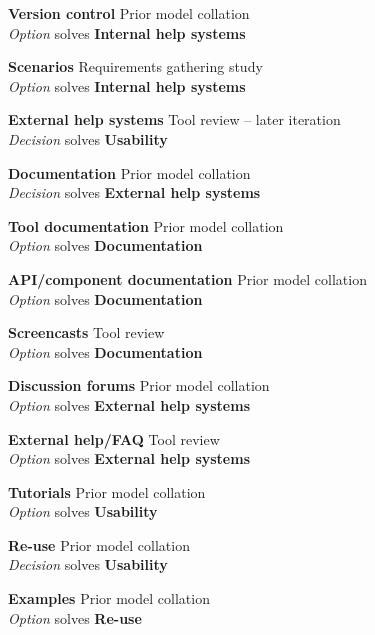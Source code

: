 \textbf{Version control} \hfill Prior model collation \cite{Grammel2010} \\ \emph{Option} \hfill solves \textbf{Internal help systems}

\textbf{Scenarios} \hfill Requirements gathering study \\ \emph{Option} \hfill solves \textbf{Internal help systems}

\textbf{External help systems} \hfill Tool review  -- later iteration \\ \emph{Decision} \hfill solves \textbf{Usability}

\textbf{Documentation} \hfill Prior model collation \cite{Grammel2010} \\ \emph{Decision} \hfill solves \textbf{External help systems}

\textbf{Tool documentation} \hfill Prior model collation \cite{Grammel2010} \\ \emph{Option} \hfill solves \textbf{Documentation}

\textbf{API/component documentation} \hfill Prior model collation \cite{Grammel2010} \\ \emph{Option} \hfill solves \textbf{Documentation}

\textbf{Screencasts} \hfill Tool review \\ \emph{Option} \hfill solves \textbf{Documentation}

\textbf{Discussion forums} \hfill Prior model collation \cite{Grammel2010} \\ \emph{Option} \hfill solves \textbf{External help systems}

\textbf{External help/FAQ} \hfill Tool review \\ \emph{Option} \hfill solves \textbf{External help systems}

\textbf{Tutorials} \hfill Prior model collation \cite{Grammel2010,Minhas2012} \\ \emph{Option} \hfill solves \textbf{Usability}


\textbf{Re-use} \hfill Prior model collation \cite{Grammel2010} \\ \emph{Decision} \hfill solves \textbf{Usability}

\textbf{Examples} \hfill Prior model collation \cite{Grammel2010} \\ \emph{Option} \hfill solves \textbf{Re-use}

